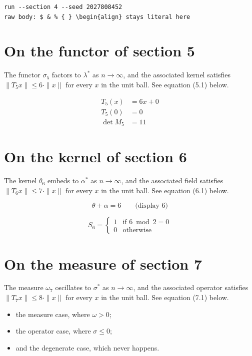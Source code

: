 \documentclass{article}
\begin{document}
\begin{verbatim}
run --section 4 --seed 2027808452
raw body: $ & % { } \begin{align} stays literal here
\end{verbatim}

\section{On the functor of section 5}
The functor $\sigma_{5}$ factors to $\lambda^{*}$ as $n \to \infty$,
and the associated kernel satisfies $\|T_{5} x\| \leq 6 \cdot \|x\|$
for every $x$ in the unit ball. See equation (5.1) below.

\begin{align}
T_{5}(x) &= 6 x + 0 \\
T_{5}(0) &= 0 \\
\det M_{5} &= 11
\end{align}

\section{On the kernel of section 6}
The kernel $\theta_{6}$ embeds to $\alpha^{*}$ as $n \to \infty$,
and the associated field satisfies $\|T_{6} x\| \leq 7 \cdot \|x\|$
for every $x$ in the unit ball. See equation (6.1) below.

$$
\theta + \alpha = 6 \qquad \text{(display 6)}
$$

\begin{equation}
S_{6} = \begin{cases} 1 & \text{if } 6 \bmod 2 = 0 \\ 0 & \text{otherwise} \end{cases}
\end{equation}

\section{On the measure of section 7}
The measure $\omega_{7}$ oscillates to $\sigma^{*}$ as $n \to \infty$,
and the associated operator satisfies $\|T_{7} x\| \leq 8 \cdot \|x\|$
for every $x$ in the unit ball. See equation (7.1) below.

\begin{itemize}
  \item the measure case, where $\omega > 0$;
  \item the operator case, where $\sigma \leq 0$;
  \item and the degenerate case, which never happens.
\end{itemize}
\end{document}
